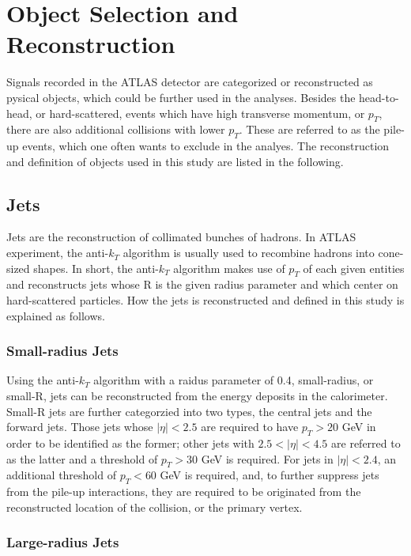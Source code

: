 \documentclass[class=NCU_thesis, crop=false]{standalone}
\begin{document}
\chapter{Object Selection and Reconstruction}
	Signals recorded in the ATLAS detector are categorized or reconstructed as pysical objects, which could be further used in the analyses. Besides the head-to-head, or hard-scattered, events which have high transverse momentum, or $p_T$, there are also additional collisions with lower $p_T$. These are referred to as the pile-up events, which one often wants to exclude in the analyes. The reconstruction and definition of objects used in this study are listed in the following.
	
\section{Jets}
	Jets are the reconstruction of collimated bunches of hadrons. In ATLAS experiment, the anti-$k_T$ algorithm is usually used to recombine hadrons into cone-sized shapes. In short, the anti-$k_T$ algorithm makes use of $p_T$ of each given entities and reconstructs jets whose R is the given radius parameter and which center on hard-scattered particles. How the jets is reconstructed and defined in this study is explained as follows.
	
	\subsection{Small-radius Jets}
		Using the anti-$k_T$ algorithm with a raidus parameter of 0.4, small-radius, or small-R, jets can be reconstructed from the energy deposits in the calorimeter. Small-R jets are further categorzied into two types, the central jets and the forward jets. Those jets whose $\lvert \eta \rvert < 2.5$ are required to have $p_T > 20$ GeV in order to be identified as the former; other jets with $2.5 < \lvert \eta \rvert < 4.5$ are referred to as the latter and a threshold of $p_T > 30$ GeV is required. For jets in $\lvert \eta \rvert < 2.4$, an additional threshold of $p_T < 60$ GeV is required, and, to further suppress jets from the pile-up interactions, they are required to be originated from the reconstructed location of the collision, or the primary vertex.
	
	\subsection{Large-radius Jets}
	
\end{document}
